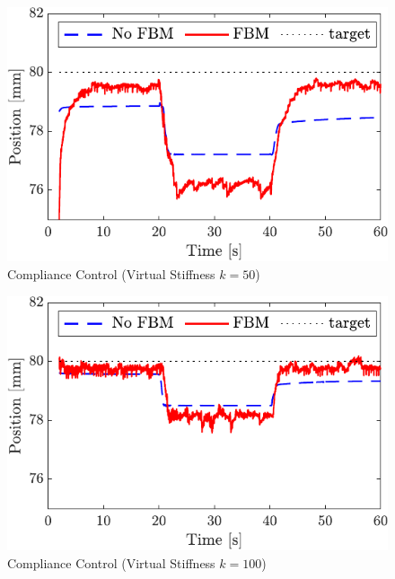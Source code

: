 \begin{figure}[t]
    \centering
        \includegraphics[keepaspectratio, scale=1.0]{contents/IntegrationControl/figure/compra/compra_k50-crop.pdf}
        \caption{Compliance Control (Virtual Stiffness $k=50$)}
        \label{fig:compra_k50-crop}
\end{figure}
\begin{figure}[t]
    \centering
        \includegraphics[keepaspectratio, scale=1.0]{contents/IntegrationControl/figure/compra/compra_k100-crop.pdf}
        \caption{Compliance Control (Virtual Stiffness $k=100$)}
        \label{fig:compra_k100-crop}
\end{figure}

